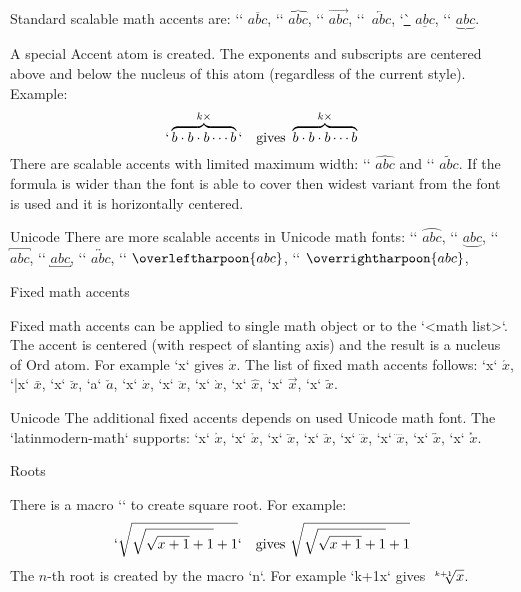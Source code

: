 Standard scalable math accents are: 
`\overline` $\overline{abc}$, 
`\overbrace` $\overbrace{abc}$,
`\overrightarrow` $\overrightarrow{abc}$,
`\overleftarrow`~$\overleftarrow{abc}$, 
`\underline` $\underline{abc}$,
`\underbrace` $\underbrace{abc}$.

A special Accent atom is created. The exponents and subscripts are centered above
and below the nucleus of this atom (regardless of the current style). Example:
$$
  `\overbrace {b\cdot b\cdot b \cdots b}^{k\times}` \quad \hbox{gives }
  \overbrace {b\cdot b\cdot b \cdots b}^{k\times}
$$
There are scalable accents with limited maximum width:
`\widehat` $\widehat{abc}$ and `\widetilde` $\widetilde{abc}$. If the
formula is wider than the font is able to cover then widest variant from the
font is used and it is horizontally centered.

\new Unicode
There are more scalable accents in Unicode math fonts:
`\overparen` $\overparen{abc}$, `\underparen` $\underparen{abc}$,
`\overbracket` $\overbracket{abc}$, `\underbracket` $\underbracket{abc}$,
`\overleftrightarrow` $\overleftrightarrow{abc}$,
`\overleftharpoon` $\overleftharpoon{abc}$,
`\overrightharpoon` $\overrightharpoon{abc}$,


\secc Fixed math accents

Fixed math accents can be applied to single math object or to the `{<math list>}`. 
The accent is centered (with respect of slanting axis) and the result is a
nucleus of Ord
atom. For example `\dot x` gives $\dot x$. The list of fixed math accents
follows: `\acute x` $\acute x$, `\bar x` $\bar x$, 
`\breve x` $\breve x$, `\check a` $\check a$, 
`\dot x` $\dot x$, `\ddot x` $\ddot x$, 
`\grave x` $\grave x$, `\hat x` $\hat x$, 
`\vec x` $\vec x$, `\tilde x` $\tilde x$.

\new Unicode
The additional fixed accents depends on used Unicode math font. The
`latinmodern-math` supports:
`\ovhook x` $\ovhook x$, `\ocirc x` $\ocirc x$, 
`\leftharpoonaccent x` $\leftharpoonaccent x$, `\rightharpoonaccent x` $\rightharpoonaccent x$, 
`\dddot x` $\dddot x$, `\ddddot x` $\ddddot x$, 
`\widebridgeabove x` $\widebridgeabove x$, `\asteraccent x` $\asteraccent x$. 

\secc Roots

There is a macro `` to create square root. For example:
$$
  `\sqrt{\sqrt{\sqrt{x+1}+1}+1}` \quad \hbox{gives }
   \sqrt{\sqrt{\sqrt{x+1}+1}+1}
$$
The $n$-th root is created by the macro `\root n`. For
example `\root k+1\of x` gives $\root k+1\of x$.

